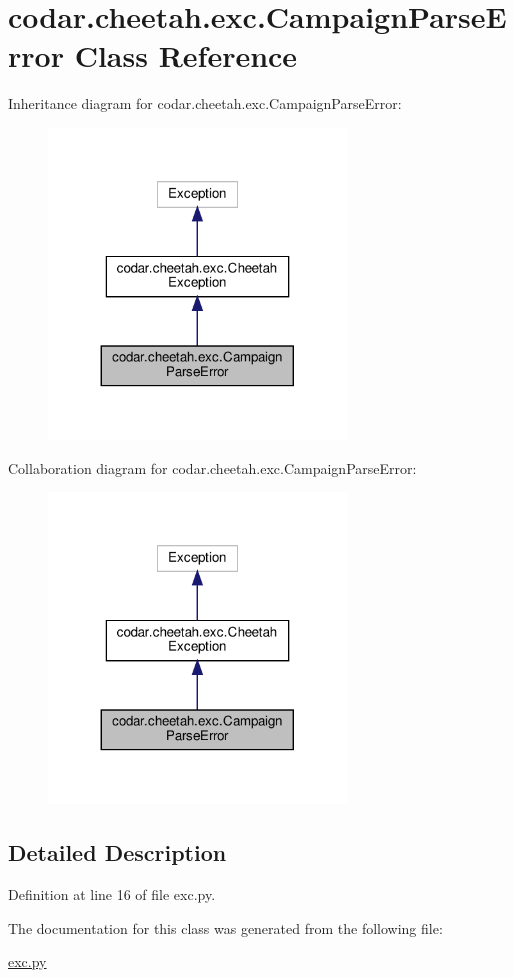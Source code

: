 \hypertarget{classcodar_1_1cheetah_1_1exc_1_1_campaign_parse_error}{}\section{codar.\+cheetah.\+exc.\+Campaign\+Parse\+Error Class Reference}
\label{classcodar_1_1cheetah_1_1exc_1_1_campaign_parse_error}


Inheritance diagram for codar.\+cheetah.\+exc.\+Campaign\+Parse\+Error\+:
\nopagebreak
\begin{figure}[H]
\begin{center}
\leavevmode
\includegraphics[width=224pt]{classcodar_1_1cheetah_1_1exc_1_1_campaign_parse_error__inherit__graph}
\end{center}
\end{figure}


Collaboration diagram for codar.\+cheetah.\+exc.\+Campaign\+Parse\+Error\+:
\nopagebreak
\begin{figure}[H]
\begin{center}
\leavevmode
\includegraphics[width=224pt]{classcodar_1_1cheetah_1_1exc_1_1_campaign_parse_error__coll__graph}
\end{center}
\end{figure}


\subsection{Detailed Description}


Definition at line 16 of file exc.\+py.



The documentation for this class was generated from the following file\+:\begin{DoxyCompactItemize}
\item 
\hyperlink{exc_8py}{exc.\+py}\end{DoxyCompactItemize}
